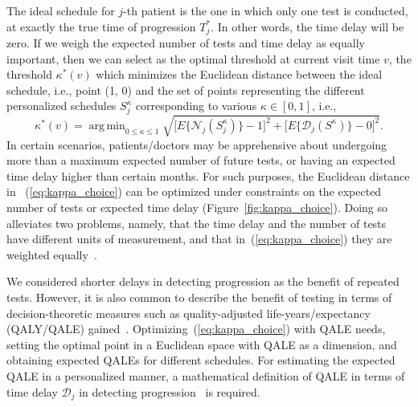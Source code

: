 \documentclass[useAMS, usenatbib, referee]{biom}
\DeclareMathOperator{\argmin}{arg\,min}
\begin{document}
The ideal schedule for $j$-th patient is the one in which only one test is conducted, at exactly the true time of progression $T^*_j$. In other words, the time delay will be zero. If we weigh the expected number of tests and time delay as equally important, then we can select as the optimal threshold at current visit time $v$, the threshold $\kappa^*(v)$ which minimizes the Euclidean distance between the ideal schedule, i.e., point (1, 0) and the set of points representing the different personalized schedules $S^{\kappa}_j$ corresponding to various $\kappa \in [0, 1]$, i.e.,
\begin{equation}
\label{eq:kappa_choice}
\kappa^*(v) = \argmin_{0 \leq \kappa \leq 1} \sqrt{\Big[E\big\{\mathcal N_j(S^\kappa_j)\big\} - 1\Big]^2 + \Big[E\big\{\mathcal D_j(S^\kappa )\big\} - 0\Big]^2}.
\end{equation}
In certain scenarios, patients/doctors may be apprehensive about undergoing more than a maximum expected number of future tests, or having an expected time delay higher than certain months. For such purposes, the Euclidean distance in ~(\ref{eq:kappa_choice}) can be optimized under constraints on the expected number of tests or expected time delay (Figure~\ref{fig:kappa_choice}). Doing so alleviates two problems, namely, that the time delay and the number of tests have different units of measurement, and that in~(\ref{eq:kappa_choice}) they are weighted equally~\citep{cook1994equivalence}.

We considered shorter delays in detecting progression as the benefit of repeated tests. However, it is also common to describe the benefit of testing in terms of decision-theoretic measures such as quality-adjusted life-years/expectancy (QALY/QALE) gained~\citep{sassi2006calculating}. Optimizing~(\ref{eq:kappa_choice}) with QALE needs, setting the optimal point in a Euclidean space with QALE as a dimension, and obtaining expected QALEs for different schedules. For estimating the expected QALE in a personalized manner, a mathematical definition of QALE in terms of time delay $\mathcal{D}_j$ in detecting progression~\citep{de2017should} is required.

\end{document}
